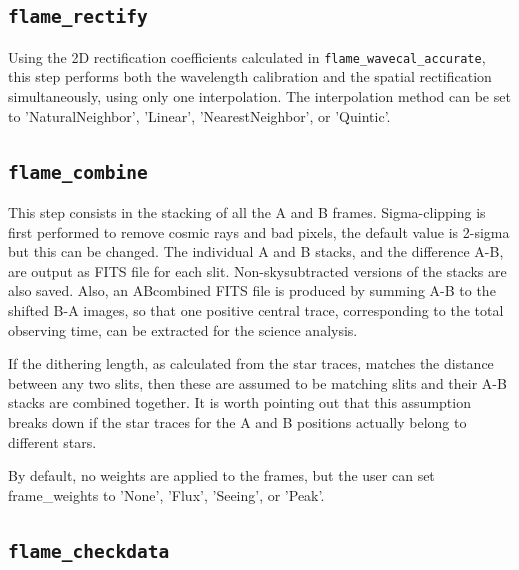 \documentclass[a4paper]{article}
\begin{document}
\begin{sloppypar}
\subsection{\texttt{flame\_rectify}}

Using the 2D rectification coefficients calculated in \texttt{flame\_wavecal\_accurate}, this step performs both the wavelength calibration and the spatial rectification simultaneously, using only one interpolation. The interpolation method can be set to 'NaturalNeighbor', 'Linear', 'NearestNeighbor', or 'Quintic'.


\subsection{\texttt{flame\_combine}}

This step consists in the stacking of all the A and B frames. Sigma-clipping is first performed to remove cosmic rays and bad pixels, the default value is 2-sigma but this can be changed. The individual A and B stacks, and the difference A-B, are output as FITS file for each slit. Non-skysubtracted versions of the stacks are also saved. Also, an ABcombined FITS file is produced by summing A-B to the shifted B-A images, so that one positive central trace, corresponding to the total observing time, can be extracted for the science analysis.

If the dithering length, as calculated from the star traces, matches the distance between any two slits, then these are assumed to be matching slits and their A-B stacks are combined together. It is worth pointing out that this assumption breaks down if the star traces for the A and B positions actually belong to different stars.

By default, no weights are applied to the frames, but the user can set frame\_weights to 'None', 'Flux', 'Seeing', or 'Peak'.


\subsection{\texttt{flame\_checkdata}}


\end{sloppypar}
\end{document}
